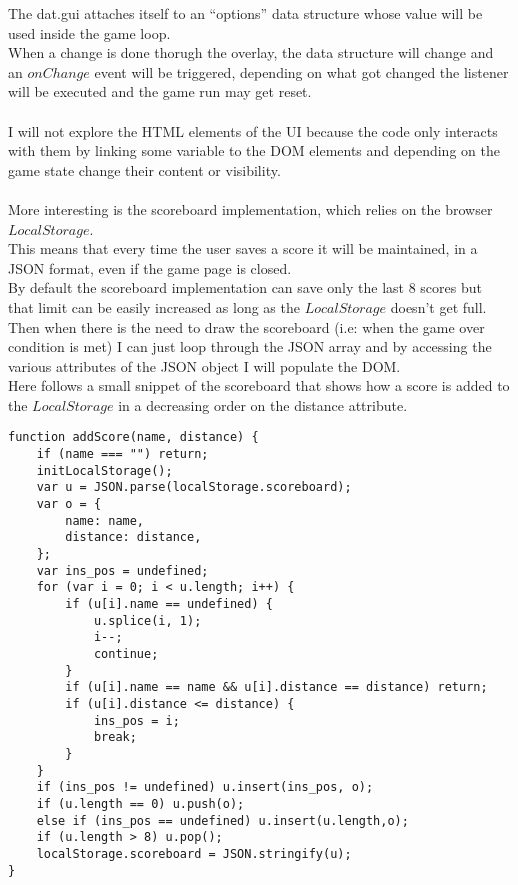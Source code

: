 \documentclass[a4paper,11pt]{article}
\begin{document}
The dat.gui attaches itself to an ``options'' data structure whose value will be used inside the game loop.\\
When a change is done thorugh the overlay, the data structure will change and an $onChange$ event will be triggered, depending on what got changed the listener will be executed and the game run may get reset.\\\\
I will not explore the HTML elements of the UI because the code only interacts with them by linking some variable to the DOM elements and depending on the game state change their content or visibility.\\\\
More interesting is the scoreboard implementation, which relies on the browser $LocalStorage$.\\
This means that every time the user saves a score it will be maintained, in a JSON format, even if the game page is closed.\\
By default the scoreboard implementation can save only the last 8 scores but that limit can be easily increased as long as the $LocalStorage$ doesn't get full.\\
Then when there is the need to draw the scoreboard (i.e: when the game over condition is met) I can just loop through the JSON array and by accessing the various attributes of the JSON object I will populate the DOM.\\
Here follows a small snippet of the scoreboard that shows how a score is added to the $LocalStorage$ in a decreasing order on the distance attribute.\\
\begin{verbatim}
function addScore(name, distance) {
    if (name === "") return;
    initLocalStorage();
    var u = JSON.parse(localStorage.scoreboard);
    var o = {
        name: name,
        distance: distance,
    };
    var ins_pos = undefined;
    for (var i = 0; i < u.length; i++) {
        if (u[i].name == undefined) {
            u.splice(i, 1);
            i--;
            continue;
        }
        if (u[i].name == name && u[i].distance == distance) return;
        if (u[i].distance <= distance) {
            ins_pos = i;
            break;
        }
    }
    if (ins_pos != undefined) u.insert(ins_pos, o);
    if (u.length == 0) u.push(o);
    else if (ins_pos == undefined) u.insert(u.length,o);
    if (u.length > 8) u.pop();
    localStorage.scoreboard = JSON.stringify(u);
}
\end{verbatim}
\end{document}
